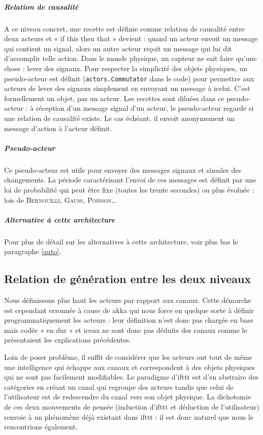 \documentclass[11pt]{article}
\begin{document}
\subparagraph{Relation de causalité} A ce niveau concret, une recette est définie comme relation de causalité entre deux acteurs et « if this then that » devient : quand un acteur envoit un message qui contient un signal, alors un autre acteur reçoit un message qui lui dit d'accomplir telle action. Dans le monde physique, un capteur ne sait faire qu'une chose : lever des signaux. Pour respecter la simplicité des objets physiques, un pseudo-acteur est définit (\texttt{actors.Commutator} dans le code) pour permettre aux acteurs de lever des signaux simplement en envoyant un message à icelui. C'est formellement un objet, pas un acteur. Les recettes sont \og diluées \fg{} dans ce pseudo-acteur : à réception d'un message signal d'un acteur, le pseudo-acteur regarde si une relation de causalité existe. Le cas échéant, il envoit anonymement un message d'action à l'acteur définit.

\subparagraph{Pseudo-acteur} Ce pseudo-acteur est utile pour envoyer des messages signaux et simuler des changements. La période caractérisant l'envoi de ces messages est définit par une loi de probabilité qui peut être fixe (toutes les trente secondes) ou plus évoluée : lois de \textsc{Bernouilli}, \textsc{Gauss}, \textsc{Poisson}\dots

\subparagraph{Alternative à cette architecture} Pour plus de détail sur les alternatives à cette architecture, voir plus bas le paragraphe \ref{auto}.

\subsection{Relation de génération entre les deux niveaux}

Nous définissons plus haut les acteurs par rapport aux canaux. Cette démarche est cependant erronnée à cause de akka qui nous force en quelque sorte à définir programmatiquement les acteurs : leur définition n'est donc pas chargée en base mais codée « en dur » et iceux ne sont donc pas déduits des canaux comme le présentaient les explications précédentes.

Loin de poser problème, il suffit de considérer que les acteurs ont tout de même une intelligence qui échappe aux canaux et correspondent à des objets physiques qui ne sont pas facilement modifiables. Le paradigme d'ifttt est d'en abstraire des catégories en créant un canal qui regroupe des acteurs tandis que celui de l'utilisateur est de redescendre du canal vers son objet physique. La dichotomie de ces deux mouvements de pensée (induction d'ifttt et déduction de l'utilisateur) renvoie à un phénomène déjà existant dans ifttt : il est donc naturel que nous le rencontrions également.
\end{document}
